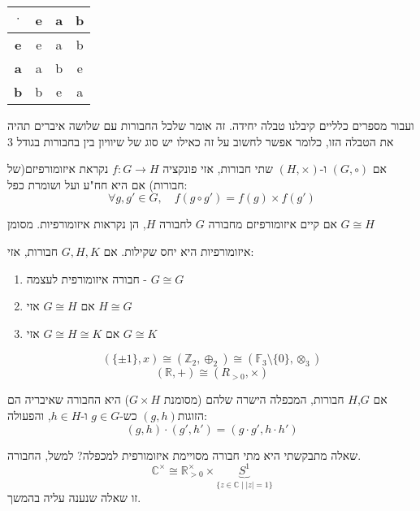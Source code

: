 \documentclass{tstextbook}
\begin{document}
\begin{table}[htbp]
  \centering
  \begin{tabular}{|cccc|}
    \hline
    \(\cdot\) & e & a & b \\ \hline
    \textbf{e} & e & a & b \\ \hline
    \textbf{a} & a & b & e \\ \hline
    \textbf{b} & b & e & a \\ \hline
  \end{tabular}
\end{table}
ועבור מספרים כלליים קיבלנו טבלה יחידה. זה אומר שלכל החבורות עם שלושה איברים תהיה את הטבלה הזו, כלומר אפשר לחשוב על זה כאילו יש סוג של שיוויון בין בחבורות בגודל 3

\begin{definition}
אם \((G,\circ)\) ו-\((H,\times)\) שתי חבורות, אזי פונקציה \(f:G\to H\) נקראת איזומורפיזם(של חבורות) אם היא חח"ע ועל ושומרת כפל:
$$\forall g,g' \in G,\quad f(g\circ g')=f(g)\times f(g')$$

\end{definition}
\begin{symbolize}
אם קיים איזומורפיזם מחבורה \(G\) לחבורה \(H\), הן נקראות איזומורפיות. מסומן \(G\cong H\)

\end{symbolize}
\begin{proposition}
איזומורפיות היא יחס שקילות. אם \(G,H,K\) חבורות, אזי:

  \begin{enumerate}
    \item חבורה איזומורפית לעצמה - \(G\cong G\)


    \item אם \(G \cong H\) אזי \(H\cong G\)


    \item אם \(G\cong H\cong K\) אזי \(G\cong K\)


  \end{enumerate}
\end{proposition}
\begin{example}
$$(\{ \pm 1 \},x)\cong (\mathbb{Z}_{2},\oplus_{2}) \cong (\mathbb{F}_{3}\setminus \{ 0 \}, \otimes_{3} )$$$$(\mathbb{R},+)\cong (R_{>0},\times)$$

\end{example}
\begin{definition}
אם \(G\),\(H\) חבורות, המכפלה הישרה שלהם (מסומנת \(G\times H\)) היא החבורה שאיבריה הם הזוגות\((g,h)\) כש-\(g\in G\) ו-\(h\in H\), והפעולה:
$$(g,h)\cdot (g',h')=(g\cdot g', h\cdot h')$$

\end{definition}
\begin{remark}
שאלה מתבקשתי היא מתי חבורה מסויימת איזומורפית למכפלה?
למשל, החבורה.
$$\mathbb{C}^{\times}\cong\mathbb{R}_{>0}^{\times}\times \underbrace{ S^1 }_{ \{ z\in \mathbb{C}\mid |z|=1 \} }$$
זו שאלה שנענה עליה בהמשך.

\end{remark}
\end{document}
